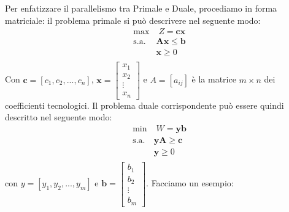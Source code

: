 \documentclass[12pt]{article}
\begin{document}
Per enfatizzare il parallelismo tra Primale e Duale, procediamo in forma matriciale:
il problema primale si può descrivere nel seguente modo:
\begin{equation*}
    \begin{array}{ll}
        \displaystyle \textrm{max} & \; Z = \boldsymbol{c}\boldsymbol{x}\\
        \textrm{s.a.} & \boldsymbol{A}\boldsymbol{x} \leq \boldsymbol{b}\\
        \phantom{} & \boldsymbol{x} \geq 0 \\
    \end{array}
\end{equation*}
Con $\boldsymbol{c} = [c_1, c_2, ..., c_n]$, $\boldsymbol{x} = \begin{bmatrix}
    x_1 \\
    x_2 \\
    \vdots \\
    x_n
\end{bmatrix}$ e $A = [a_{ij}]$ è la matrice $m \times n$ dei coefficienti tecnologici.
Il problema duale corrispondente può essere quindi descritto nel seguente modo:
\begin{equation*}
    \begin{array}{ll}
        \displaystyle \textrm{min} & \; W = \boldsymbol{y}\boldsymbol{b}\\
        \textrm{s.a.} & \boldsymbol{y}\boldsymbol{A} \geq \boldsymbol{c}\\
        \phantom{} & \boldsymbol{y} \geq 0 \\
    \end{array}
\end{equation*}
con $y = [y_1, y_2, ..., y_m]$ e $\boldsymbol{b} = \begin{bmatrix}
    b_1 \\
    b_2 \\
    \vdots \\
    b_m
\end{bmatrix}$. \newline
Facciamo un esempio:
\begin{center}
    \vspace{-0.2cm}
\end{center}
\end{document}
